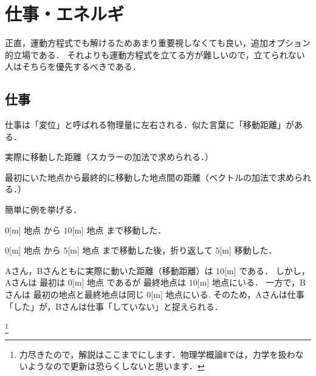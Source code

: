 \documentclass[a4paper,11pt]{ltjsarticle}
\begin{document}
\pagestyle{fancy}
\rhead{}
\cfoot{\thepage}
  
\section{仕事・エネルギ}

正直，運動方程式でも解けるためあまり重要視しなくても良い，追加オプション的立場である．
それよりも運動方程式を立てる方が難しいので，立てられない人はそちらを優先するべきである．

\subsection{仕事}
仕事は「変位」と呼ばれる物理量に左右される．似た言葉に「移動距離」がある．


\begin{screen}
  \begin{description}
    \item[移動距離]実際に移動した距離（スカラーの加法で求められる．）\\
    \item[変位]最初にいた地点から最終的に移動した地点間の距離（ベクトルの加法で求められる．）
  \end{description}
\end{screen}


簡単に例を挙げる．


\begin{screen}
  \begin{description}
    \item[Aさん] $0$[m] 地点 から $10$[m] 地点 まで移動した． \\
    \item[Bさん] $0$[m] 地点 から $5$[m] 地点 まで移動した後，折り返して $5$[m] 移動した．
  \end{description}
\end{screen}


Aさん，Bさんともに実際に動いた距離（移動距離）は $10$[m] である．
しかし，Aさんは 最初は $0$[m] 地点 であるが 最終地点は $10$[m] 地点にいる．
一方で，Bさんは 最初の地点と最終地点は同じ $0$[m] 地点にいる.
そのため，Aさんは仕事「した」が，Bさんは仕事「していない」と捉えられる．

\footnote{
  力尽きたので，解説はここまでにします．物理学概論Ⅱでは，力学を扱わないようなので更新は恐らくしないと思います．
}
\end{document}
